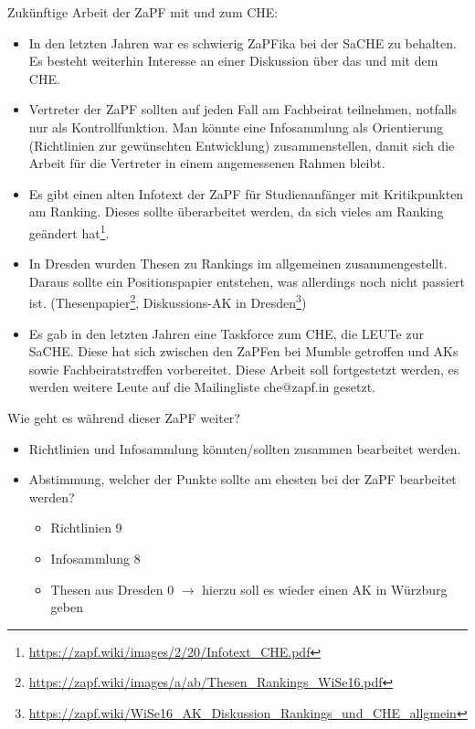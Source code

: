       Zukünftige Arbeit der ZaPF mit und zum CHE:
      \begin{itemize}
        \item In den letzten Jahren war es schwierig ZaPFika bei der SaCHE zu behalten. Es besteht weiterhin Interesse an einer Diskussion über das und mit dem CHE.
        \item Vertreter der ZaPF sollten auf jeden Fall am Fachbeirat teilnehmen, notfalls nur als Kontrollfunktion. Man könnte eine Infosammlung als Orientierung (Richtlinien zur gewünschten Entwicklung) zusammenstellen, damit sich die Arbeit für die Vertreter in einem angemessenen Rahmen bleibt.
        \item Es gibt einen alten Infotext der ZaPF für Studienanfänger mit Kritikpunkten am Ranking. Dieses sollte überarbeitet werden, da sich vieles am Ranking geändert hat\footnote{\url{https://zapf.wiki/images/2/20/Infotext_CHE.pdf}}.
        \item In Dresden wurden Thesen zu Rankings im allgemeinen zusammengestellt. Daraus sollte ein Positionspapier entstehen, was allerdings noch nicht passiert ist. (Thesenpapier\footnote{\url{https://zapf.wiki/images/a/ab/Thesen_Rankings_WiSe16.pdf}},  Diskussions-AK in Dresden\footnote{\url{https://zapf.wiki/WiSe16_AK_Diskussion_Rankings_und_CHE_allgmein}})
        \item Es gab in den letzten Jahren eine Taskforce zum CHE, die LEUTe zur SaCHE. Diese hat sich zwischen den ZaPFen bei Mumble getroffen und AKs sowie Fachbeiratstreffen vorbereitet. Diese Arbeit soll fortgestetzt werden, es werden weitere Leute auf die Mailingliste che@zapf.in gesetzt.
      \end{itemize}

      Wie geht es während dieser ZaPF weiter?
      \begin{itemize}
        \item Richtlinien und Infosammlung könnten/sollten zusammen bearbeitet werden.
        \item Abstimmung, welcher der Punkte sollte am ehesten bei der ZaPF bearbeitet werden?
          \begin{itemize}
            \item Richtlinien 9
            \item Infosammlung 8
            \item Thesen aus Dresden 0 $\rightarrow$ hierzu soll es wieder einen AK in Würzburg geben
          \end{itemize}
      \end{itemize}

